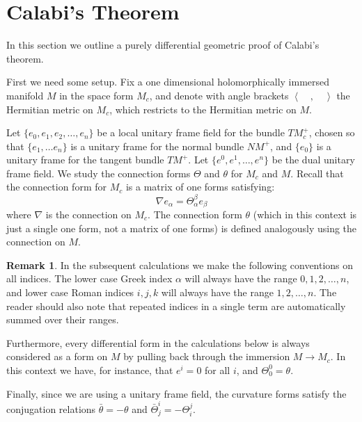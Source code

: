 \documentclass[11pt]{amsart}
\theoremstyle{definition}
\newtheorem{remark}[subsection]{Remark}
\def \la { \left\langle }
\def \ra { \right\rangle }
\def \TMp{ TM^{+} }
\def \NMp{ NM^+ }
\def \TMps{ T^{\ast}M^{+} }
\begin{document}
\section{Calabi's Theorem}

In this section we outline a purely differential geometric proof of Calabi's theorem. 

First we need some setup.  Fix a one dimensional holomorphically immersed manifold $M$ in the space form $M_c$, and denote with angle brackets $\la \quad , \quad \ra$ the Hermitian metric on $M_c$, which restricts to the Hermitian metric on $M$.

Let $\{e_0, e_1, e_2, \ldots , e_n\}$ be a local unitary frame field for the bundle $TM_c^{+}$, chosen so that $\{e_1, \ldots e_n\}$ is a unitary frame for the normal bundle $\NMp$, and $\{ e_0 \}$ is a unitary frame for the tangent bundle $\TMp$.  Let $\{e^0, e^1, \ldots, e^n\}$ be the dual unitary frame field.  We study the connection forms $\Theta$ and $\theta$ for $M_c$ and $M$. Recall that the connection form for $M_c$ is a matrix of one forms satisfying:
%
$$ \nabla e_\alpha = \Theta^{\beta}_{\alpha} e_{\beta} $$
%
where $\nabla$ is the connection on $M_c$.  The connection form $\theta$ (which in this context is just a single one form, not a matrix of one forms) is defined analogously using the connection on $M$.  

\begin{remark} 
%
In the subsequent calculations we make the following conventions on all indices.  The lower case Greek index $\alpha$ will always have the range $0,1,2,\ldots,n$, and lower case Roman indices $i,j,k$ will always have the range $1,2,\ldots,n$.  The reader should also note that repeated indices in a single term are automatically summed over their ranges. 

Furthermore, every differential form in the calculations below is always considered as a form on $M$ by pulling back through the immersion $M \rightarrow M_c$.  In this context we have, for instance, that $e^i = 0$ for all $i$, and $\Theta^0_0 = \theta$.  

Finally, since we are using a unitary frame field, the curvature forms satisfy the conjugation relations $\bar{\theta} = - \theta$ and $\bar{\Theta}^i_j = - \Theta^j_i$.
%
\end{remark}

\bigskip

\end{document}
